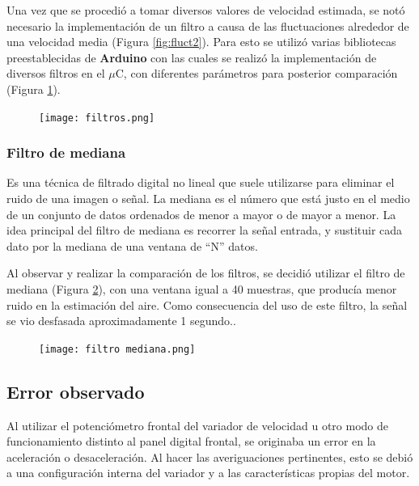 Una vez que se procedió a tomar diversos valores de velocidad estimada, se notó necesario la implementación
de un filtro a causa de las fluctuaciones alrededor de una velocidad media (Figura \ref{fig:fluct2}). Para esto se utilizó varias bibliotecas preestablecidas de \textbf{Arduino} con las cuales se realizó la implementación de diversos filtros en el $\mu$C, con diferentes parámetros para posterior comparación (Figura \ref{fig:filtros}).


\begin{figure}[H]
	\centering
	\texttt{[image: filtros.png]}
	\label{fig:filtros}
\end{figure}


\subsubsection{Filtro de mediana}
\begin{tcolorbox}[colback=blue!5!white,colframe=blue!75!black,title=Mediana]
	Es una técnica de filtrado digital no lineal que suele utilizarse para eliminar el ruido de una imagen o señal. La mediana es el número que está justo en el medio de un conjunto de datos ordenados de menor a mayor o de mayor a menor.
	La idea principal del filtro de mediana es recorrer la señal entrada, y sustituir cada dato por la mediana de una ventana de “N” datos.
\end{tcolorbox}

Al observar y realizar la comparación de los filtros, se decidió utilizar el filtro de mediana (Figura \ref{fig:filtrosm}), con una ventana igual a 
40 muestras, que producía menor ruido en la estimación del aire. Como consecuencia del uso de este filtro, la señal se vio desfasada aproximadamente 1 segundo..

\begin{figure}[H]
	\centering
	\texttt{[image: filtro mediana.png]}
	\label{fig:filtrosm}
\end{figure}



\subsection{Error observado}\label{sec:error}
Al utilizar el potenciómetro frontal del variador de velocidad u otro modo de funcionamiento distinto al panel digital frontal, se originaba un error en la aceleración o desaceleración.  Al hacer las averiguaciones pertinentes, esto se debió a una configuración interna del
variador y a las características propias del motor.


